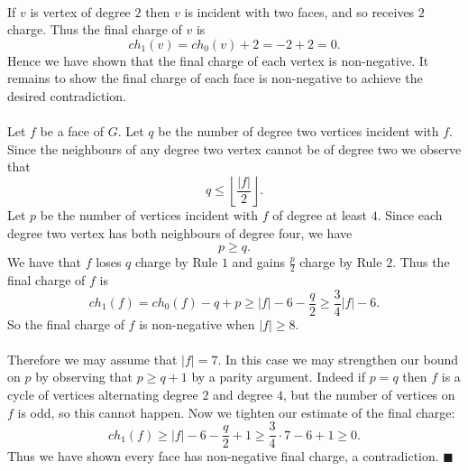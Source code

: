 \documentclass[letterpaper,12pt,oneside,onecolumn]{article}
\newcommand{\floor}[1]{\ensuremath{\left\lfloor#1\right\rfloor}}
\begin{document}
\paragraph{}
If $v$ is vertex of degree $2$ then $v$ is incident with two faces, and so receives $2$ charge. Thus the final charge of $v$ is
$$ch_1(v) = ch_0(v) + 2 = -2 + 2 = 0.$$
Hence we have shown that the final charge of each vertex is non-negative. It remains to show the final charge of each face is non-negative to achieve the desired contradiction.
\paragraph{}
Let $f$ be a face of $G$. Let $q$ be the number of degree two vertices incident with $f$. Since the neighbours of any degree two vertex cannot be of degree two we observe that
$$q \leq \floor{\frac{|f|}{2}}.$$
Let $p$ be the number of vertices incident with $f$ of degree at least $4$. Since each degree two vertex has both neighbours of degree four, we have
$$p \geq q.$$
We have that $f$ loses $q$ charge by Rule $1$ and gains $\frac{p}{2}$ charge by Rule $2.$ Thus the final charge of $f$ is
$$ch_1(f) = ch_0(f) -q + p \geq |f| -6 -\frac{q}{2} \geq \frac{3}{4}|f| - 6.$$
So the final charge of $f$ is non-negative when $|f| \geq 8$.
\paragraph{}
Therefore we may assume that $|f| = 7$. In this case we may strengthen our bound on $p$ by observing that
$p \geq q+1$
by a parity argument. Indeed if $p = q$ then $f$ is a cycle of vertices alternating degree $2$ and degree $4$, but the number of vertices on $f$ is odd, so this cannot happen. Now we tighten our estimate of the final charge:
$$ch_1(f) \geq |f| - 6 -\frac{q}{2} + 1 \geq \frac{3}{4}\cdot 7 - 6 + 1 \geq 0.$$
Thus we have shown every face has non-negative final charge, a contradiction. $\blacksquare$

\newpage
\section{}
\end{document}
